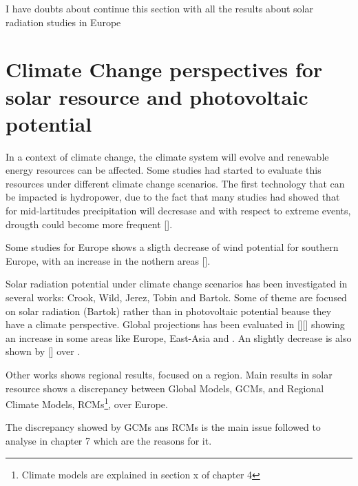 



{\color{red}I have doubts about continue this section with all the results about solar radiation studies in Europe}

\section{Climate Change perspectives for solar resource and photovoltaic potential}



In a context of climate change, the climate system will evolve and renewable energy resources can be affected. Some studies had started to evaluate this resources under different climate change scenarios. The first technology that can be impacted is hydropower, due to the fact that many studies had showed that for mid-lartitudes precipitation will decresase and with respect to extreme events, drougth could become more frequent [].

Some studies for Europe shows a sligth decrease of wind potential for southern Europe, with an increase in the nothern areas [].

Solar radiation potential under climate change scenarios has been investigated in several works: Crook, Wild, Jerez, Tobin and Bartok. Some of theme are focused on solar radiation (Bartok) rather than in photovoltaic potential beause they have a climate perspective. Global projections has been evaluated in [][] showing an increase in some areas like Europe, East-Asia and . An slightly decrease is also shown by [] over .

Other works shows regional results, focused on a region. Main results in solar resource shows a discrepancy between Global Models, GCMs, and Regional Climate Models, RCMs\footnote{Climate models are explained in section x of chapter 4}, over Europe.

The discrepancy showed by GCMs ans RCMs is the main issue followed to analyse in chapter 7 which are the reasons for it.

% 
